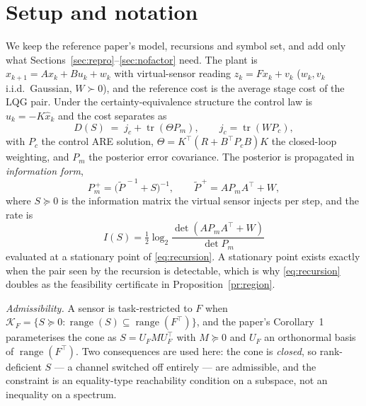 \section{Setup and notation}
\label{sec:setup}

We keep the reference paper's model, recursions and symbol set, and add only
what Sections~\ref{sec:repro}--\ref{sec:nofactor} need. The plant is
$x_{k+1}=Ax_k+Bu_k+w_k$ with virtual-sensor reading $z_k=Fx_k+v_k$
($w_k,v_k$ i.i.d.\ Gaussian, $W\succ0$), and the reference cost is the average
stage cost of the LQG pair. Under the certainty-equivalence structure the control
law is $u_k=-K\hat x_k$ and the cost separates as
\begin{equation}
 D(S)\;=\;j_c+\operatorname{tr}(\Theta P_m),\qquad
 j_c=\operatorname{tr}(WP_c),
\label{eq:cost}
\end{equation}
with $P_c$ the control ARE solution, $\Theta=K^{\top}(R+B^{\top}P_cB)K$ the
closed-loop weighting, and $P_m$ the posterior error covariance. The
posterior is propagated in \emph{information form},
\begin{equation}
 P_m^{\,+}=\big(\tilde P^{\,-1}+S\big)^{-1},\qquad
 \tilde P^{\,+}=AP_mA^{\top}+W,
\label{eq:recursion}
\end{equation}
where $S\succeq0$ is the information matrix the virtual sensor injects per step,
and the rate is
\begin{equation}
 I(S)=\tfrac12\log_2\frac{\det(AP_mA^{\top}+W)}{\det P_m}
\label{eq:rate}
\end{equation}
evaluated at a stationary point of \eqref{eq:recursion}. A stationary point
exists exactly when the pair seen by the recursion is detectable, which is why
\eqref{eq:recursion} doubles as the feasibility certificate in
Proposition~\ref{pr:region}.

\emph{Admissibility.} A sensor is task-restricted to $F$ when
$\mathcal K_F=\{S\succeq0:\operatorname{range}(S)\subseteq
\operatorname{range}(F^{\top})\}$, and the paper's Corollary~1 parameterises the
cone as $S=U_FMU_F^{\top}$ with $M\succeq0$ and $U_F$ an orthonormal basis of
$\operatorname{range}(F^{\top})$. Two consequences are used here: the cone is
\emph{closed}, so rank-deficient $S$ --- a channel switched off entirely --- are
admissible, and the constraint is an equality-type reachability condition on a
subspace, not an inequality on a spectrum.

